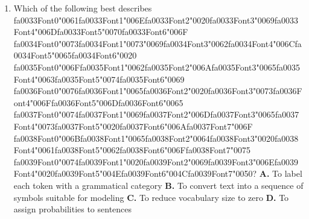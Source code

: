\documentclass[11pt]{article}
\begin{document}
\begin{enumerate}[leftmargin=*]
  \item Which of the following best describes {\csname fa0033Font0\endcsname\char"0061}{\csname fa0033Font1\endcsname\char"006E}{\csname fa0033Font2\endcsname\char"0020}{\csname fa0033Font3\endcsname\char"0069}{\csname fa0033Font4\endcsname\char"006D}{\csname fa0033Font5\endcsname\char"0070}{\csname fa0033Font6\endcsname\char"006F} {\csname fa0034Font0\endcsname\char"0073}{\csname fa0034Font1\endcsname\char"0073}{\char"0069}{\csname fa0034Font3\endcsname\char"0062}{\csname fa0034Font4\endcsname\char"006C}{\csname fa0034Font5\endcsname\char"0065}{\csname fa0034Font6\endcsname\char"0020} {\csname fa0035Font0\endcsname\char"006F}{\csname fa0035Font1\endcsname\char"0062}{\csname fa0035Font2\endcsname\char"006A}{\csname fa0035Font3\endcsname\char"0065}{\csname fa0035Font4\endcsname\char"0063}{\csname fa0035Font5\endcsname\char"0074}{\csname fa0035Font6\endcsname\char"0069} {\csname fa0036Font0\endcsname\char"0076}{\csname fa0036Font1\endcsname\char"0065}{\csname fa0036Font2\endcsname\char"0020}{\csname fa0036Font3\endcsname\char"0073}{\csname fa0036Font4\endcsname\char"006F}{\csname fa0036Font5\endcsname\char"006D}{\csname fa0036Font6\endcsname\char"0065} {\csname fa0037Font0\endcsname\char"0074}{\csname fa0037Font1\endcsname\char"0069}{\csname fa0037Font2\endcsname\char"006D}{\csname fa0037Font3\endcsname\char"0065}{\csname fa0037Font4\endcsname\char"0073}{\csname fa0037Font5\endcsname\char"0020}{\csname fa0037Font6\endcsname\char"006A}{\csname fa0037Font7\endcsname\char"006F} {\csname fa0038Font0\endcsname\char"006B}{\csname fa0038Font1\endcsname\char"0065}{\csname fa0038Font2\endcsname\char"0064}{\csname fa0038Font3\endcsname\char"0020}{\csname fa0038Font4\endcsname\char"0061}{\csname fa0038Font5\endcsname\char"0062}{\csname fa0038Font6\endcsname\char"006F}{\csname fa0038Font7\endcsname\char"0075} {\csname fa0039Font0\endcsname\char"0074}{\csname fa0039Font1\endcsname\char"0020}{\csname fa0039Font2\endcsname\char"0069}{\csname fa0039Font3\endcsname\char"006E}{\csname fa0039Font4\endcsname\char"0020}{\csname fa0039Font5\endcsname\char"004E}{\csname fa0039Font6\endcsname\char"004C}{\csname fa0039Font7\endcsname\char"0050}?
    \textbf{A.} To label each token with a grammatical category
    \textbf{B.} To convert text into a sequence of symbols suitable for modeling
    \textbf{C.} To reduce vocabulary size to zero
    \textbf{D.} To assign probabilities to sentences


\end{enumerate}
\end{document}
